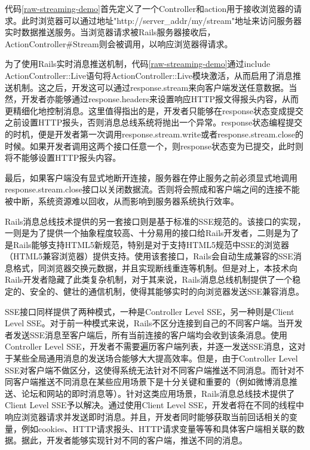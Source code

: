 代码\ref{raw-streaming-demo}首先定义了一个Controller和action用于接收浏览器的请求。此时浏览器可以通过地址"http://server\_addr/my/stream"地址来访问服务器实时数据推送服务。当浏览器请求被Rails服务器接收后，ActionController\#Stream则会被调用，以响应浏览器得请求。

为了使用Rails实时消息推送机制，代码\ref{raw-streaming-demo}通过include ActionController::Live语句将ActionController::Live模块激活，从而启用了消息推送机制。这之后，开发这可以通过response.stream来向客户端发送任意数据。当然，开发者亦能够通过response.headers来设置响应HTTP报文得报头内容，从而更精细化地控制消息。这里值得指出的是，开发者只能够在response状态变成提交之前设置HTTP报头，否则消息总线系统将抛出一个异常。response状态编程提交的时机，便是开发者第一次调用response.stream.write或者response.stream.close的时候。如果开发者调用这两个接口任意一个，则response状态变为已提交，此时则将不能够设置HTTP报头内容。

最后，如果客户端没有显式地断开连接，服务器在停止服务之前必须显式地调用response.stream.close接口以关闭数据流。否则将会照成和客户端之间的连接不能被中断，系统资源难以回收，从而影响到服务器系统执行效率。

Rails消息总线技术提供的另一套接口则是基于标准的SSE规范的。该接口的实现，一则是为了提供一个抽象程度较高、十分易用的接口给Rails开发者，二则是为了是Rails能够支持HTML5新规范，特别是对于支持HTML5规范中SSE的浏览器（HTML5兼容浏览器）提供支持。使用该套接口，Rails会自动生成兼容的SSE消息格式，同浏览器交换元数据，并且实现断线重连等机制。但是对上，本技术向Rails开发者隐藏了此类复杂机制，对于其来说，Rails消息总线机制提供了一个稳定的、安全的、健壮的通信机制，使得其能够实时的向浏览器发送SSE兼容消息。

SSE接口同样提供了两种模式，一种是Controller Level SSE，另一种则是Client Level SSE。对于前一种模式来说，Rails不区分连接到自己的不同客户端。当开发者发送SSE消息至客户端后，所有当前连接的客户端均会收到该条消息。使用Controller Level SSE，开发者不需要遍历客户端列表，并逐一发送SSE消息，这对于某些全局通用消息的发送场合能够大大提高效率。但是，由于Controller Level SSE对客户端不做区分，这使得系统无法针对不同客户端推送不同消息。而针对不同客户端推送不同消息在某些应用场景下是十分关键和重要的（例如微博消息推送、论坛和网站的即时消息等）。针对这类应用场景，Rails消息总线技术提供了Client Level SSE予以解决。通过使用Client Level SSE，开发者将在不同的线程中响应浏览器请求并发送即时消息。并且，开发者同时能够获取当前回话相关的变量，例如cookies、HTTP请求报头、HTTP请求变量等等和具体客户端相关联的数据。据此，开发者能够实现针对不同的客户端，推送不同的消息。


